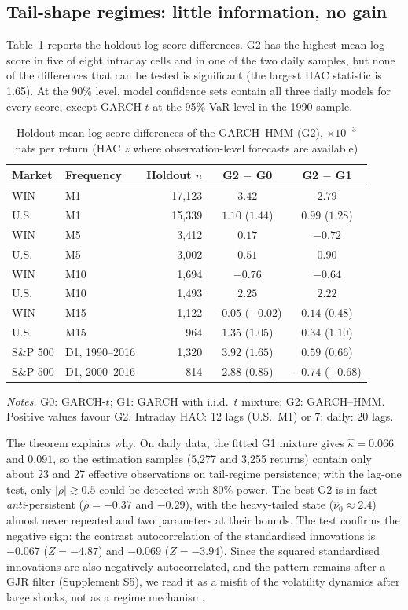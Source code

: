 \documentclass[12pt,letterpaper]{article}
\theoremstyle{plain}
\theoremstyle{remark}
\begin{document}
\subsection{Tail-shape regimes: little information, no gain}
Table~\ref{tab:dens} reports the holdout log-score differences. G2 has the highest mean log score in five of eight intraday cells and in one of the two daily samples, but none of the differences that can be tested is significant (the largest HAC statistic is 1.65). At the 90\% level, model confidence sets contain all three daily models for every score, except GARCH-$t$ at the 95\% VaR level in the 1990 sample.

\begin{table}[ht]
\centering\small
\caption{Holdout mean log-score differences of the GARCH--HMM (G2), $\times10^{-3}$ nats per return (HAC $z$ where observation-level forecasts are available)}\label{tab:dens}
\begin{tabular}{llrcc}
\toprule
Market & Frequency & Holdout $n$ & G2 $-$ G0 & G2 $-$ G1\\
\midrule
WIN & M1 & 17{,}123 & $3.42$ & $2.79$\\
U.S. & M1 & 15{,}339 & $1.10$ ($1.44$) & $0.99$ ($1.28$)\\
WIN & M5 & 3{,}412 & $0.17$ & $-0.72$\\
U.S. & M5 & 3{,}002 & $0.51$ & $0.90$\\
WIN & M10 & 1{,}694 & $-0.76$ & $-0.64$\\
U.S. & M10 & 1{,}493 & $2.25$ & $2.22$\\
WIN & M15 & 1{,}122 & $-0.05$ ($-0.02$) & $0.14$ ($0.48$)\\
U.S. & M15 & 964 & $1.35$ ($1.05$) & $0.34$ ($1.10$)\\
S\&P 500 & D1, 1990--2016 & 1{,}320 & $3.92$ ($1.65$) & $0.59$ ($0.66$)\\
S\&P 500 & D1, 2000--2016 & 814 & $2.88$ ($0.85$) & $-0.74$ ($-0.68$)\\
\bottomrule
\end{tabular}
\par\smallskip\footnotesize\emph{Notes.} G0: GARCH-$t$; G1: GARCH with i.i.d.\ $t$ mixture; G2: GARCH--HMM. Positive values favour G2. Intraday HAC: 12 lags (U.S.\ M1) or 7; daily: 20 lags.
\end{table}

The theorem explains why. On daily data, the fitted G1 mixture gives $\hat\kappa=0.066$ and $0.091$, so the estimation samples (5{,}277 and 3{,}255 returns) contain only about 23 and 27 effective observations on tail-regime persistence; with the lag-one test, only $|\rho|\gtrsim0.5$ could be detected with 80\% power. The best G2 is in fact \emph{anti}-persistent ($\hat\rho=-0.37$ and $-0.29$), with the heavy-tailed state ($\hat\nu_0\approx2.4$) almost never repeated and two parameters at their bounds. The test confirms the negative sign: the contrast autocorrelation of the standardised innovations is $-0.067$ ($Z=-4.87$) and $-0.069$ ($Z=-3.94$). Since the squared standardised innovations are also negatively autocorrelated, and the pattern remains after a GJR filter (Supplement S5), we read it as a misfit of the volatility dynamics after large shocks, not as a regime mechanism.
\end{document}
